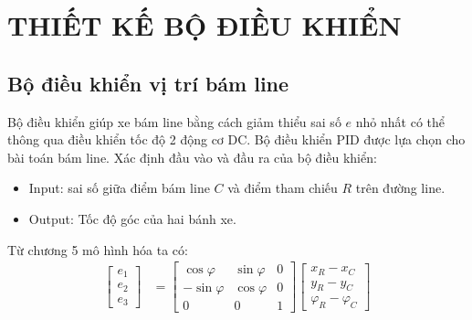 \chapter{THIẾT KẾ BỘ ĐIỀU KHIỂN}
     \section{Bộ điều khiển vị trí bám line}
          \hspace*{0.6cm}Bộ điều khiển giúp xe bám line bằng cách giảm thiểu sai số $e$ nhỏ nhất có thể thông qua điều khiển tốc độ 2 động cơ DC. Bộ điều khiển PID được lựa chọn cho bài toán bám line.
          \newline
          \hspace*{0.6cm}Xác định đầu vào và đầu ra của bộ điều khiển:
          \begin{itemize}
               \item Input: sai số giữa điểm bám line $C$ và điểm tham chiếu $R$ trên đường line.
               \item Output: Tốc độ góc của hai bánh xe.
          \end{itemize}
          \hspace*{0.6cm}Từ chương 5 mô hình hóa ta có:
          \begin{align}
               \begin{bmatrix}
                    e_1 \\
                    e_2 \\
                    e_3
                    \end{bmatrix} &= \begin{bmatrix}
                    \cos\varphi & \sin \varphi & 0 \\
                    -\sin\varphi & \cos \varphi & 0 \\
                    0 & 0 & 1
                    \end{bmatrix} \begin{bmatrix}
                    x_R - x_C \\
                    y_R - y_C \\
                    \varphi_R - \varphi_C
               \end{bmatrix} 
               \label{c6_e1}
          \end{align}

